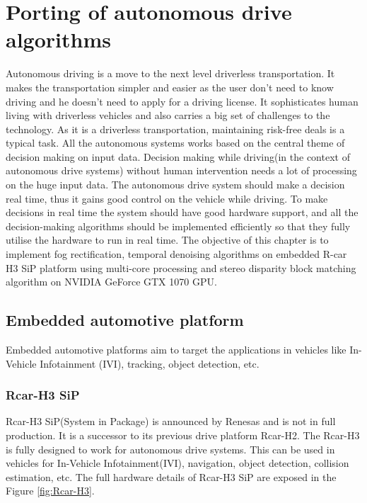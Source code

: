 \chapter{Porting of autonomous drive algorithms}
Autonomous driving is a move to the next level driverless transportation. It makes the transportation simpler and easier as the user don’t need to know driving and he doesn't need to apply for a driving license. It sophisticates human living with driverless vehicles and also carries a big set of challenges to the technology. As it is a driverless transportation, maintaining risk-free deals is a typical task. All the autonomous systems works based on the central theme of decision making on input data. Decision making while driving(in the context of autonomous drive systems) without human intervention needs a lot of processing on the huge input data. The autonomous drive system should make a decision real time, thus it gains good control on the vehicle while driving. To make decisions in real time the system should have good hardware support, and all the decision-making algorithms should be implemented efficiently so that they fully utilise the hardware to run in real time. The objective of this chapter is to implement fog rectification, temporal denoising algorithms on embedded R-car H3 SiP platform using multi-core processing and stereo disparity block matching algorithm on NVIDIA GeForce GTX 1070 GPU. 
\section{Embedded automotive platform}
Embedded automotive platforms aim to target the applications in vehicles like In-Vehicle Infotainment (IVI), tracking, object detection, etc. 
\subsection{Rcar-H3 SiP}
Rcar-H3 SiP(System in Package) is announced by Renesas and is not in full production. It is a successor to its previous drive platform Rcar-H2. The Rcar-H3 is fully designed to work for autonomous drive systems. This can be used in vehicles for In-Vehicle Infotainment(IVI), navigation, object detection, collision estimation, etc. The full hardware details of Rcar-H3 SiP are exposed in the Figure \ref{fig:Rcar-H3}.
